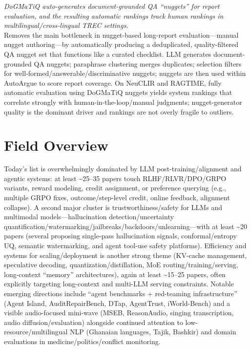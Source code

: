 \documentclass[12pt,letterpaper]{article}
\begin{document}
{\small\textit{DoGMaTiQ auto-generates document-grounded QA ``nuggets'' for report evaluation, and the resulting automatic rankings track human rankings in multilingual/cross-lingual TREC settings.}}\\[1pt]
{\footnotesize Removes the main bottleneck in nugget-based long-report evaluation---manual nugget authoring---by automatically producing a deduplicated, quality-filtered QA nugget set that functions like a curated checklist. LLM generates document-grounded QA nuggets; paraphrase clustering merges duplicates; selection filters for well-formed/answerable/discriminative nuggets; nuggets are then used within AutoArgue to score report coverage. On NeuCLIR and RAGTIME, fully automatic evaluation using DoGMaTiQ nuggets yields system rankings that correlate strongly with human-in-the-loop/manual judgments; nugget-generator quality is the dominant driver and rankings are not overly fragile to outliers.}

\medskip



\section*{Field Overview}
{\footnotesize Today's list is overwhelmingly dominated by LLM post-training/alignment and agentic systems: at least \textasciitilde{}25--35 papers touch RLHF/RLVR/DPO/GRPO variants, reward modeling, credit assignment, or preference querying (e.g., multiple GRPO fixes, outcome/step-level credit, online feedback, alignment collapse). A second major cluster is trustworthiness/safety for LLMs and multimodal models---hallucination detection/uncertainty quantification/watermarking/jailbreaks/backdoors/unlearning---with at least \textasciitilde{}20 papers (several proposing single-pass hallucination signals, conformal/entropy UQ, semantic watermarking, and agent tool-use safety platforms). Efficiency and systems for scaling/deployment is another strong theme (KV-cache management, speculative decoding, quantization/distillation, MoE routing/training/serving, long-context ``memory'' architectures), again at least \textasciitilde{}15--25 papers, often explicitly targeting long-context and multi-LLM serving constraints. Notable emerging directions include ``agent benchmarks + red-teaming infrastructure'' (Agent Island, AuditRepairBench, DTap, AgentTrust, iWorld-Bench) and a visible audio-focused mini-wave (MSEB, ReasonAudio, singing transcription, audio diffusion/evaluation) alongside continued attention to low-resource/multilingual NLP (Ghanaian languages, Tajik, Bashkir) and domain evaluations in medicine/politics/conflict monitoring.}
\end{document}
